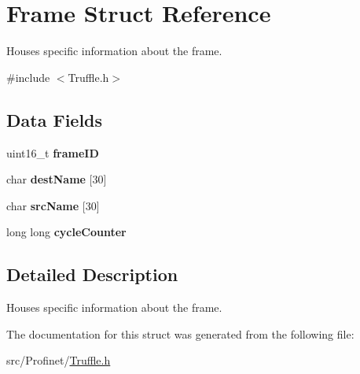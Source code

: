 \hypertarget{struct_frame}{\section{Frame Struct Reference}
\label{struct_frame}
}


Houses specific information about the frame.  




{\ttfamily \#include $<$Truffle.\-h$>$}

\subsection*{Data Fields}
\begin{DoxyCompactItemize}
\item 
\hypertarget{struct_frame_a3167f81dde5c4ed242144d0e36d3e4b9}{uint16\-\_\-t {\bfseries frame\-I\-D}}\label{struct_frame_a3167f81dde5c4ed242144d0e36d3e4b9}

\item 
\hypertarget{struct_frame_abe6dedff4e4c79805082000e56a7707b}{char {\bfseries dest\-Name} \mbox{[}30\mbox{]}}\label{struct_frame_abe6dedff4e4c79805082000e56a7707b}

\item 
\hypertarget{struct_frame_ae75f7c4ffa15acfdb02104e20cad4ed2}{char {\bfseries src\-Name} \mbox{[}30\mbox{]}}\label{struct_frame_ae75f7c4ffa15acfdb02104e20cad4ed2}

\item 
\hypertarget{struct_frame_a1dc17f9f9d892cec2bcac8027d0bc8cf}{long long {\bfseries cycle\-Counter}}\label{struct_frame_a1dc17f9f9d892cec2bcac8027d0bc8cf}

\end{DoxyCompactItemize}


\subsection{Detailed Description}
Houses specific information about the frame. 

The documentation for this struct was generated from the following file\-:\begin{DoxyCompactItemize}
\item 
src/\-Profinet/\hyperlink{_truffle_8h}{Truffle.\-h}\end{DoxyCompactItemize}

